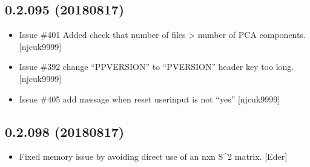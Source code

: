 \documentclass[a4paper,10pt,english]{report}
\begin{document}
\subsection{0.2.095 (2018\sphinxhyphen{}08\sphinxhyphen{}17)}
\label{\detokenize{misc/changelog:id383}}\begin{itemize}
\item {} 
Issue \#401 \sphinxhyphen{} Added check that number of  files \textgreater{} number of
PCA components. {[}njcuk9999{]}

\item {} 
Issue \#392 change “PPVERSION” to “PVERSION” \sphinxhyphen{} header key too long.
{[}njcuk9999{]}

\item {} 
Issue \#405 \sphinxhyphen{} add message when reset userinput is not “yes” {[}njcuk9999{]}

\end{itemize}


\subsection{0.2.098 (2018\sphinxhyphen{}08\sphinxhyphen{}17)}
\label{\detokenize{misc/changelog:id384}}\begin{itemize}
\item {} 
Fixed memory issue by avoiding direct use of an nxn S\textasciicircum{}2 matrix. {[}Eder{]}

\end{itemize}
\end{document}
